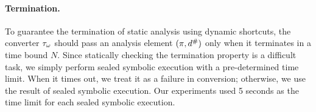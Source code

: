 \paragraph{Termination.}
To guarantee the termination of static analysis using dynamic shortcuts, the
converter ${\tau}_\omega$ should pass an analysis element $(\pi, {d}^{\#})$
only when it terminates in a time bound $N$.  Since statically checking the
termination property is a difficult task, we simply perform sealed symbolic
execution with a pre-determined time limit.  When it times out,
we treat it as a failure in conversion;
otherwise, we use the result of sealed symbolic execution.  Our experiments used
5 seconds as the time limit for each sealed symbolic execution.






